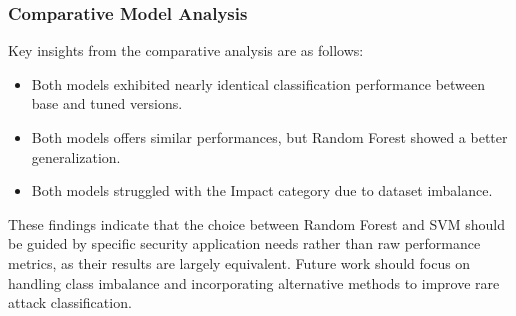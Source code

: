         \subsubsection{Comparative Model Analysis\\}
        
            Key insights from the comparative analysis are as follows:
            
            \begin{itemize}
                \item Both models exhibited nearly identical classification performance between base and tuned versions.
                \item Both models offers similar performances, but Random Forest showed a better generalization.
                \item Both models struggled with the Impact category due to dataset imbalance.
            \end{itemize}
            
        These findings indicate that the choice between Random Forest and SVM should be guided by specific security application needs rather than raw performance metrics, as their results are largely equivalent. Future work should focus on handling class imbalance and incorporating alternative methods to improve rare attack classification.
